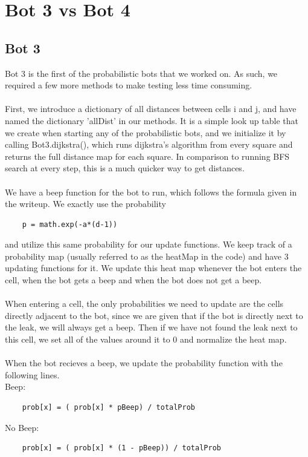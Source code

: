 \documentclass[12pt]{article}
\begin{document}
\section*{Bot 3 vs Bot 4}
\subsection*{Bot 3}
Bot 3 is the first of the probabilistic bots that we worked on. As such, we required a few more 
methods to make testing less time consuming. 
\\
\\
First, we introduce a dictionary of all distances between cells i and j, 
and have named the dictionary 'allDist' in our methods. It is a simple look up table that we create
when starting any of the probabilistic bots, and we initialize it by calling Bot3.dijkstra(), which 
runs dijkstra's algorithm from every square and returns the full distance map for each square. In comparison 
to running BFS search at every step, this is a much quicker way to get distances.
\\
\\
We have a beep function for the bot to run, which follows the formula given in the writeup. We exactly 
use the probability 
\begin{lstlisting}
    p = math.exp(-a*(d-1))
\end{lstlisting} 
and utilize this same probability for our update functions. We keep track of a probability map 
(usually referred to as the heatMap in the code) and have 3 updating functions for it. We update this 
heat map whenever the bot enters the cell, when the bot gets a beep and when the bot does not get a beep. 
\\
\\
When entering a cell, the only probabilities we need to update are the cells directly adjacent to the bot, 
since we are given that if the bot is directly next to the leak, we will always get a beep. Then if we 
have not found the leak next to this cell, we set all of the values around it to 0 and normalize the heat map. 
\\
\\
When the bot recieves a beep, we update the probability function with the following lines. 
\\
Beep: 
\begin{lstlisting}
    prob[x] = ( prob[x] * pBeep) / totalProb
\end{lstlisting}
No Beep:
\begin{lstlisting}
    prob[x] = ( prob[x] * (1 - pBeep)) / totalProb
\end{lstlisting}
\end{document}
